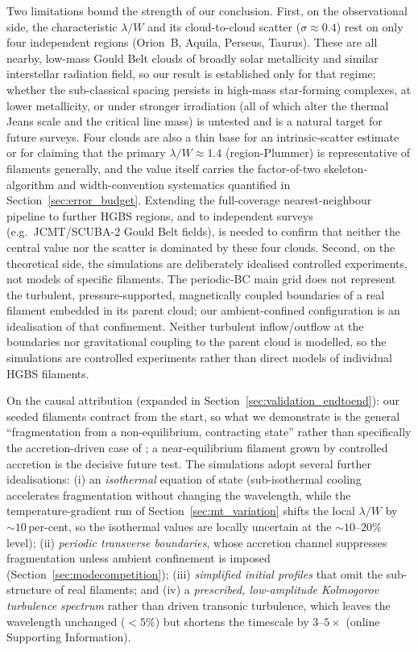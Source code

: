 \documentclass[usenatbib,twoside,twocolumn]{mnras}
\begin{document}
Two limitations bound the strength of our conclusion. First, on the observational side, the characteristic $\lambda/W$ and its cloud-to-cloud scatter ($\sigma\approx0.4$) rest on only four independent regions (Orion~B, Aquila, Perseus, Taurus). These are all nearby, low-mass Gould Belt clouds of broadly solar metallicity and similar interstellar radiation field, so our result is established only for that regime; whether the sub-classical spacing persists in high-mass star-forming complexes, at lower metallicity, or under stronger irradiation (all of which alter the thermal Jeans scale and the critical line mass) is untested and is a natural target for future surveys. Four clouds are also a thin base for an intrinsic-scatter estimate or for claiming that the primary $\lambda/W\approx1.4$ (region-Plummer) is representative of filaments generally, and the value itself carries the factor-of-two skeleton-algorithm and width-convention systematics quantified in Section~\ref{sec:error_budget}. Extending the full-coverage nearest-neighbour pipeline to further HGBS regions, and to independent surveys (e.g.\ JCMT/SCUBA-2 Gould Belt fields), is needed to confirm that neither the central value nor the scatter is dominated by these four clouds. Second, on the theoretical side, the simulations are deliberately idealised controlled experiments, not models of specific filaments. The periodic-BC main grid does not represent the turbulent, pressure-supported, magnetically coupled boundaries of a real filament embedded in its parent cloud; our ambient-confined configuration is an idealisation of that confinement. Neither turbulent inflow/outflow at the boundaries nor gravitational coupling to the parent cloud is modelled, so the simulations are controlled experiments rather than direct models of individual HGBS filaments.

On the causal attribution (expanded in Section~\ref{sec:validation_endtoend}): our seeded filaments contract from the start, so what we demonstrate is the general ``fragmentation from a non-equilibrium, contracting state'' rather than specifically the accretion-driven case of \citet{Clarke2016,Clarke2017}; a near-equilibrium filament grown by controlled accretion is the decisive future test. The simulations adopt several further idealisations: (i) an \emph{isothermal} equation of state (sub-isothermal cooling accelerates fragmentation without changing the wavelength, while the temperature-gradient run of Section~\ref{sec:mt_variation} shifts the local $\lambda/W$ by $\sim10$\,per-cent, so the isothermal values are locally uncertain at the $\sim10$--$20\%$ level); (ii) \emph{periodic transverse boundaries}, whose accretion channel suppresses fragmentation unless ambient confinement is imposed (Section~\ref{sec:modecompetition}); (iii) \emph{simplified initial profiles} that omit the sub-structure of real filaments; and (iv) a \emph{prescribed, low-amplitude Kolmogorov turbulence spectrum} rather than driven transonic turbulence, which leaves the wavelength unchanged ($<5\%$) but shortens the timescale by $3$--$5\times$ (online Supporting Information).
\end{document}
